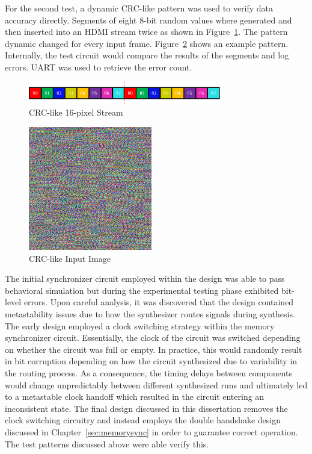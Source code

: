         For the second test, a dynamic CRC-like pattern was used to verify data accuracy directly. Segments of eight 8-bit random values where generated and then inserted into an HDMI stream twice as shown in Figure~\ref{fig:crc_like_buffer}. The pattern dynamic changed for every input frame. Figure~\ref{fig:random_noise} shows an example pattern. Internally, the test circuit would compare the results of the segments and log errors. UART was used to retrieve the error count.

        \begin{figure}[t]
            \centering
            \includegraphics[width=0.75\textwidth]{fig/crc_like_buffer.pdf}
            \caption{CRC-like 16-pixel Stream}
            \label{fig:crc_like_buffer}
        \end{figure}

        \begin{figure}[t]
            \centering
            \includegraphics{fig/random_noise.png}
            \caption{CRC-like Input Image}
            \label{fig:random_noise}
        \end{figure}

        The initial synchronizer circuit employed within the design was able to pass behavioral simulation but during the experimental testing phase exhibited bit-level errors. Upon careful analysis, it was discovered that the design contained metastability issues due to how the synthesizer routes signals during synthesis. The early design employed a clock switching strategy within the memory synchronizer circuit. Essentially, the clock of the circuit was switched depending on whether the circuit was full or empty. In practice, this would randomly result in bit corruption depending on how the circuit synthesized due to variability in the routing process. As a consequence, the timing delays between components would change unpredictably between different synthesized runs and ultimately led to a metastable clock handoff which resulted in the circuit entering an inconsistent state. The final design discussed in this dissertation removes the clock switching circuitry and instead employs the double handshake design discussed in Chapter~\ref{sec:memorysync} in order to guarantee correct operation. The test patterns discussed above were able verify this.


